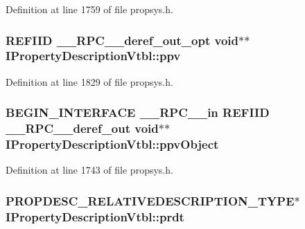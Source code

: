 Definition at line 1759 of file propsys.\+h.

\subsubsection[{\texorpdfstring{ppv}{ppv}}]{ {\bf R\+E\+F\+I\+ID} {\bf \+\_\+\+\_\+\+R\+P\+C\+\_\+\+\_\+deref\+\_\+out\+\_\+opt} {\bf void}$\ast$$\ast$ I\+Property\+Description\+Vtbl\+::ppv}\hypertarget{struct_i_property_description_vtbl_a59f7efe16a5404345c37d16abd397375}{}\label{struct_i_property_description_vtbl_a59f7efe16a5404345c37d16abd397375}


Definition at line 1829 of file propsys.\+h.

\subsubsection[{\texorpdfstring{ppv\+Object}{ppvObject}}]{\setlength{\rightskip}{0pt plus 5cm}B\+E\+G\+I\+N\+\_\+\+I\+N\+T\+E\+R\+F\+A\+CE {\bf \+\_\+\+\_\+\+R\+P\+C\+\_\+\+\_\+in} {\bf R\+E\+F\+I\+ID} {\bf \+\_\+\+\_\+\+R\+P\+C\+\_\+\+\_\+deref\+\_\+out} {\bf void}$\ast$$\ast$ I\+Property\+Description\+Vtbl\+::ppv\+Object}\hypertarget{struct_i_property_description_vtbl_af417fc53ef667199c30b85b95c601df9}{}\label{struct_i_property_description_vtbl_af417fc53ef667199c30b85b95c601df9}


Definition at line 1743 of file propsys.\+h.

\subsubsection[{\texorpdfstring{prdt}{prdt}}]{ {\bf P\+R\+O\+P\+D\+E\+S\+C\+\_\+\+R\+E\+L\+A\+T\+I\+V\+E\+D\+E\+S\+C\+R\+I\+P\+T\+I\+O\+N\+\_\+\+T\+Y\+PE}$\ast$ I\+Property\+Description\+Vtbl\+::prdt}\hypertarget{struct_i_property_description_vtbl_a6411970619950d0e628c0268036309fd}{}\label{struct_i_property_description_vtbl_a6411970619950d0e628c0268036309fd}


